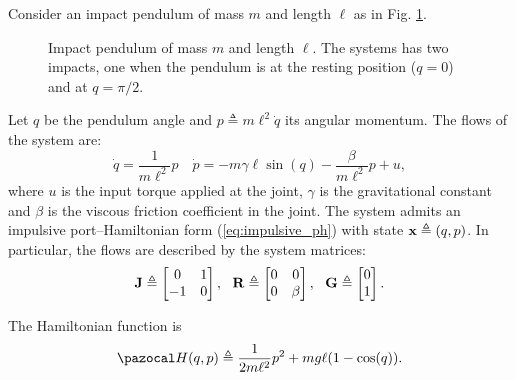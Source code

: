 \begin{exmp}\label{ex:ipend}
    Consider an impact pendulum of mass $m$ and length $\ell$ as in Fig. \ref{fig:ipend}.
    \begin{figure}
        \centering
        
        \caption[Impact pendulum]{Impact pendulum of mass $m$ and length $\ell$. The systems has two impacts, one when the pendulum is at the resting position ($q=0$) and at $q = \pi/2$.}
        \label{fig:ipend}
    \end{figure}
    Let $q$ be the pendulum angle and $p \triangleq m \ell^2 \dot{q}$ its angular momentum. The flows of the system are:
    \begin{equation}
        \dot{q} = \frac{1}{m\ell^2}p \quad
        \dot{p} = -m\gamma\ell\sin(q)-\frac{\beta}{m\ell^2}p + u,
    \end{equation}
    where $u$ is the input torque applied at the joint, $\gamma$ is the gravitational constant and $\beta$ is the viscous friction coefficient in the joint. The system admits an impulsive port--Hamiltonian form (\ref{eq:impulsive_ph}) with state $\mathbf{x}\triangleq(q,p)$. In particular, the flows are described by the system matrices:
    \begin{equation}
        \mathbf{J}\triangleq\begin{bmatrix}0&1\\-1&0\end{bmatrix},~~\mathbf{R}\triangleq \begin{bmatrix}0&0\\0&\beta\end{bmatrix},~~\mathbf{G}\triangleq\begin{bmatrix}0\\1\end{bmatrix}.
    \end{equation}
    
    The Hamiltonian function is 
    \begin{equation}
        \Ha(q,p)\triangleq\frac{1}{2m\ell^2}p^2 + mg\ell(1-\cos(q)).
    \end{equation}
    

\end{exmp}

